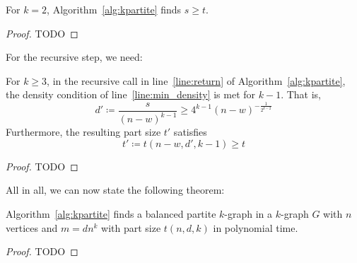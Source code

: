 \begin{lemma}
    For $k=2$, Algorithm~\ref{alg:kpartite} finds $s \geq t$.
    \begin{proof}
        TODO %
    \end{proof}
\end{lemma}

For the recursive step, we need:

\begin{lemma}
    For $k \geq 3$, in the recursive call in line~\ref{line:return} of Algorithm~\ref{alg:kpartite},
    the density condition of line~\ref{line:min_density} is met for $k-1$.
    That is,
    \[
        d' \coloneqq \frac{s}{(n-w)^{k-1}} \geq 4^{k-1} (n-w)^{-\frac{1}{2^{k-2}}}
    \]
    Furthermore,
    the resulting part size $t'$ satisfies
    \[
        t' \coloneqq t(n - w, d', k - 1) \geq t
    \]
    \begin{proof}
        TODO %
    \end{proof}

\end{lemma}

All in all, we can now state the following theorem:

\begin{theorem}
    Algorithm~\ref{alg:kpartite} finds a balanced partite $k$-graph in a $k$-graph $G$ with
    $n$ vertices and $m = d n^k$ with part size $t(n, d, k)$ in polynomial time.
    \begin{proof}
        TODO %
    \end{proof}
\end{theorem}





